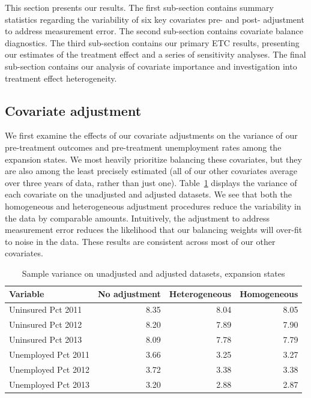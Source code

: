 This section presents our results. The first sub-section contains summary statistics regarding the variability of six key covariates pre- and post- adjustment to address measurement error. The second sub-section contains covariate balance diagnostics. The third sub-section contains our primary ETC results, presenting our estimates of the treatment effect and a series of sensitivity analyses. The final sub-section contains our analysis of covariate importance and investigation into treatment effect heterogeneity.

\subsection{Covariate adjustment}

We first examine the effects of our covariate adjustments on the variance of our pre-treatment outcomes and pre-treatment unemployment rates among the expansion states. We most heavily prioritize balancing these covariates, but they are also among the least precisely estimated (all of our other covariates average over three years of data, rather than just one). Table~\ref{tab:adjust1} displays the variance of each covariate on the unadjusted and adjusted datasets. We see that both the homogeneous and heterogeneous adjustment procedures reduce the variability in the data by comparable amounts. Intuitively, the adjustment to address measurement error reduces the likelihood that our balancing weights will over-fit to noise in the data. These results are consistent across most of our other covariates.

\begin{table}[ht]
\caption{Sample variance on unadjusted and adjusted datasets, expansion states}
\label{tab:adjust1}
\begin{tabular}{lrrr}
  \hline
Variable & No adjustment & Heterogeneous & Homogeneous \\ 
  \hline
Uninsured Pct 2011 & 8.35 & 8.04 & 8.05 \\ 
  Uninsured Pct 2012 & 8.20 & 7.89 & 7.90 \\ 
  Uninsured Pct 2013 & 8.09 & 7.78 & 7.79 \\ 
  Unemployed Pct 2011 & 3.66 & 3.25 & 3.27 \\ 
  Unemployed Pct 2012 & 3.72 & 3.38 & 3.38 \\ 
  Unemployed Pct 2013 & 3.20 & 2.88 & 2.87 \\ 
   \hline
\end{tabular}
\end{table}

